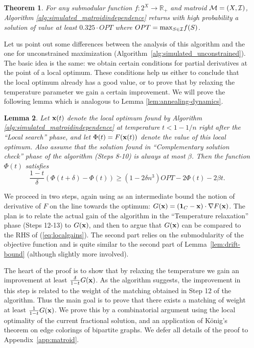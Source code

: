 \documentclass{article}[11pt]
\newtheorem{theorem}{Theorem}[section]
\newtheorem{lemma}[theorem]{Lemma}
\def\b1{{\bf 1}}
\def\bx{{\bf x}}
\def\RR{{\mathbb R}}
\def\cM{{\cal M}}
\def\cI{{\cal I}}
\def\max{{\rm{max}}}
\def\G{{G}}
\begin{document}
\begin{theorem}
\label{thm:0.325-approx}
For any submodular function $f:2^X \rightarrow \RR_+$ and matroid $\cM = (X,\cI)$,
Algorithm \ref{alg:simulated_matroidindependence} returns with high probability
a solution of value at least $0.325 \cdot OPT$ where $OPT = \max_{S \in \cI} f(S)$.
\end{theorem}

Let us point out some differences between the analysis of this algorithm
and the one for unconstrained maximization (Algorithm~\ref{alg:simulated_unconstrained}).
The basic idea is the same: we obtain certain conditions for partial derivatives
at the point of a local optimum. These conditions help us either to conclude
that the local optimum already has a good value, or to prove that by relaxing
the temperature parameter we gain a certain improvement. 
We will prove the following lemma which is analogous to Lemma \ref{lem:annealing-dynamics}.

\begin{lemma}
\label{lem:diffeq}
Let $\bx(t)$ denote the local optimum found by Algorithm \ref{alg:simulated_matroidindependence}
at temperature $t < 1-1/n$ right after the ``Local search'' phase,
and let $\Phi(t) = F(\bx(t))$ denote the value of this local optimum.
Also assume that the solution found in ``Complementary solution check'' phase
of the algorithm (Steps 8-10) is always at most $\beta$.
Then the function $\Phi(t)$ satisfies
\begin{equation}
\label{eq:localgains}
  \frac{1-t}{\delta} (\Phi(t+\delta) - \Phi(t))  \geq
 (1-2\delta n^3) OPT - 2 \Phi(t) - 2 \beta t.
  \end{equation}
\end{lemma}

We proceed in two steps, again using as an intermediate bound
the notion of derivative of $F$ on the line towards the optimum:
$\G(\bx)=(\b1_C - \bx) \cdot \nabla F(\bx)$.
The plan is to relate the actual gain of the algorithm in the ``Temperature relaxation''
 phase (Steps 12-13) to $G(\bx)$, and then to argue that $G(\bx)$ can be compared
to the RHS of (\ref{eq:localgains}).
The second part relies on the submodularity of the objective function and is quite similar
to the second part of Lemma~\ref{lem:drift-bound} (although slightly more involved).

The heart of the proof is to show that by relaxing the temperature
we gain an improvement at least $\frac{\delta}{1-t} G(\bx)$. As the algorithm suggests,
the improvement in this step is related to the weight of the matching obtained in Step 12
of the algorithm. Thus the main goal is to prove that there exists a matching of weight
at least $\frac{1}{1-t} G(\bx)$. We prove this by a combinatorial argument using
the local optimality of the current fractional solution, and 
an application of K\"{o}nig's theorem on edge colorings of bipartite graphs.
We defer all details of the proof to Appendix~\ref{app:matroid}.
\end{document}

